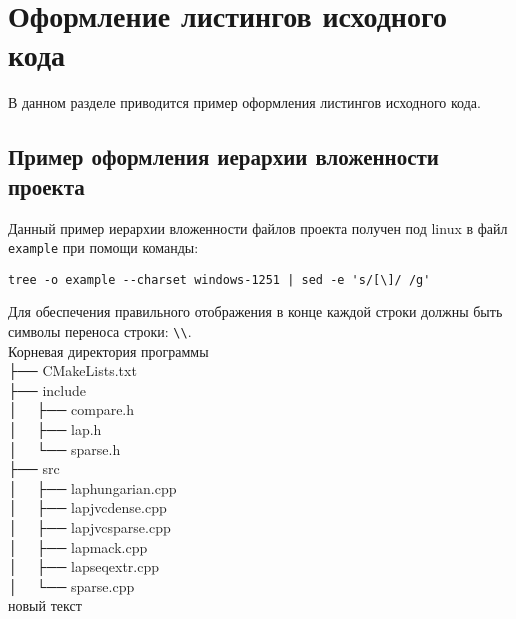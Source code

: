 \newpage\section{Оформление листингов исходного кода}

В данном разделе приводится пример оформления листингов исходного кода.

\subsection{Пример оформления иерархии вложенности проекта}

Данный пример иерархии вложенности файлов проекта получен под linux в файл \lstinline|example| при помощи команды:

\begin{lstlisting}[numbers=none]
tree -o example --charset windows-1251 | sed -e 's/[\]/ /g'
\end{lstlisting}

Для обеспечения правильного отображения в конце каждой строки должны быть символы переноса строки: \lstinline|\\|.\\

{
\listingtextsize\noindent
Корневая директория программы\\
├── CMakeLists.txt\\
├── include\\
│   ├── compare.h\\
│   ├── lap.h\\
│   └── sparse.h\\
├── src\\
│   ├── laphungarian.cpp\\
│   ├── lapjvcdense.cpp\\
│   ├── lapjvcsparse.cpp\\
│   ├── lapmack.cpp\\
│   ├── lapseqextr.cpp\\
│   └── sparse.cpp\\

}
новый текст

